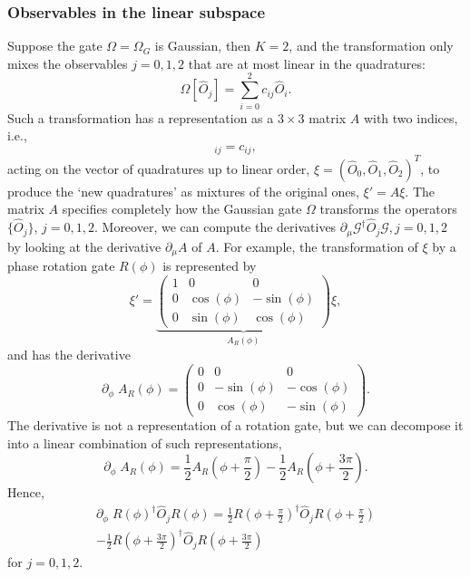 \documentclass[aps,pra,10pt,twocolumn,groupedaddress,nofootinbib]{revtex4-1}
\theoremstyle{plain}
\begin{document}
\subsubsection{Observables in the linear subspace}
Suppose the gate $\Omega = \Omega_G$ is Gaussian, then $K=2$, and the transformation only mixes the observables $j=0,1,2$ that are at most linear in the quadratures: 
\begin{equation}
 \Omega[\hat{O}_j] = \sum_{i=0}^2 c_{ij} \hat{O}_i.
 \label{Eq:omega_gaussian}
\end{equation}
Such a transformation has a representation as a $3\times 3$ matrix $A$ with two indices, i.e., 
\begin{equation}
 [A]_{ij} = c_{ij},
\end{equation}
acting on the vector of quadratures up to linear order, $\xi = (\hat{O}_0, \hat{O}_1, \hat{O}_2)^T$, to produce the `new quadratures' as mixtures of the original ones, $\xi' = A \xi$. The matrix $A$ specifies completely how the Gaussian gate $\Omega$ transforms the operators $\{\hat{O}_j\}$, $j=0,1,2$. Moreover, we can compute the derivatives $\partial_{\mu} \mathcal{G}^\dagger \hat{O}_j \mathcal{G}, j=0,1,2$ by looking at the derivative  $\partial_{\mu}A$ of $A$. For example, the transformation of $\xi$ by a phase rotation gate $R(\phi)$ is represented by 
\[
	\xi' =  \underbrace{
	\begin{pmatrix} 
	1 & 0 & 0 \\ 
	0 & \cos(\phi) & -\sin(\phi) \\ 
	0 & \sin(\phi) & \cos(\phi) 
	\end{pmatrix}}_{A_R(\phi)} \xi, 
\]
and has the derivative
\[ 
	\partial_{\phi} \; A_R(\phi) = 
	\begin{pmatrix}0 & 0 & 0 \\ 
	0 &  -\sin(\phi) & -\cos(\phi) \\ 
	0 & \cos(\phi) & -\sin(\phi) 
	\end{pmatrix}.
\]
The derivative is not a representation of a rotation gate, but we can decompose it into a linear combination of such representations,
\[\partial_{\phi} \; A_R(\phi) =  \frac{1}{2} A_R(\phi + \frac{\pi}{2}) - \frac{1}{2} A_R(\phi + \frac{3\pi}{2}). \]  
Hence, 
\begin{multline}
	\partial_{\phi} \; R(\phi)^{\dagger} \hat{O}_j R(\phi) = \frac{1}{2}R(\phi+ \frac{\pi}{2})^{\dagger} \hat{O}_j R(\phi+ \frac{\pi}{2}) \\ 
	- \frac{1}{2} R(\phi+ \frac{3\pi}{2})^{\dagger} \hat{O}_j R(\phi+ \frac{3\pi}{2})
\end{multline}
for $j = 0,1,2$. \\
\end{document}
